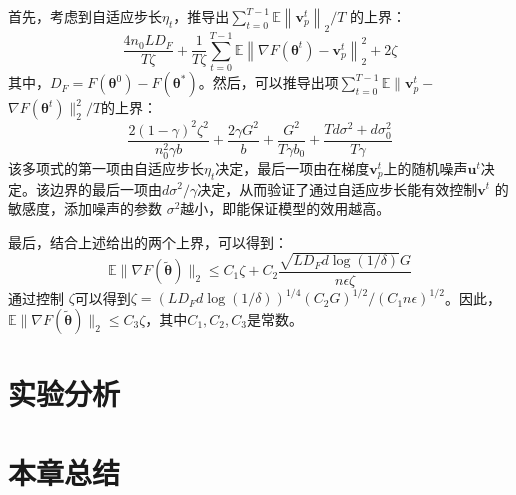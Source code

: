 首先，考虑到自适应步长$\eta_{t}$，推导出$\sum_{t=0}^{T-1} \mathbb{E}\left\|\mathbf{v}_{p}^{t}\right\|_{2} / T$ 的上界：
$$
\frac{4 n_{0} L D_{F}}{T \zeta}+\frac{1}{T \zeta} \sum_{t=0}^{T-1} \mathbb{E}\left\|\nabla F\left(\boldsymbol{\theta}^{t}\right)-\mathbf{v}_{p}^{t}\right\|_{2}^{2}+2 \zeta
$$
其中，$D_{F}=F\left(\boldsymbol{\theta}^{0}\right)-F\left(\boldsymbol{\theta}^{*}\right)$。然后，可以推导出项$\sum_{t=0}^{T-1} \mathbb{E} \| \mathbf{v}_{p}^{t}-$ $\nabla F\left(\boldsymbol{\theta}^{t}\right) \|_{2}^{2} / T$的上界：
$$
\frac{2(1-\gamma)^{2} \zeta^{2}}{n_{0}^{2} \gamma b}+\frac{2 \gamma G^{2}}{b}+\frac{G^{2}}{T \gamma b_{0}}+\frac{T d \sigma^{2}+d \sigma_{0}^{2}}{T \gamma}
$$
该多项式的第一项由自适应步长$\eta_{t}$决定，最后一项由在梯度$\mathbf{v}_{p}^{t}$上的随机噪声$\mathbf{u}^{t}$决定。该边界的最后一项由$d \sigma^{2} / \gamma$决定，从而验证了通过自适应步长能有效控制$\mathbf{v}^{t}$ 的敏感度，添加噪声的参数 $\sigma^{2}$越小，即能保证模型的效用越高。

最后，结合上述给出的两个上界，可以得到：
$$
\mathbb{E}\|\nabla F(\widetilde{\boldsymbol{\theta}})\|_{2} \leq C_{1} \zeta+C_{2} \frac{\sqrt{L D_{F} d \log (1 / \delta)} G}{n \epsilon \zeta}
$$
通过控制 $\zeta$可以得到$\zeta=\left(L D_{F} d \log (1 / \delta)\right)^{1 / 4}\left(C_{2} G\right)^{1 / 2} /\left(C_{1} n \epsilon\right)^{1 / 2}$。因此，$\mathbb{E}\|\nabla F(\widetilde{\boldsymbol{\theta}})\|_{2} \leq C_{3} \zeta$，其中$C_{1}, C_{2}, C_{3}$是常数。

\section{实验分析}

\section{本章总结}


